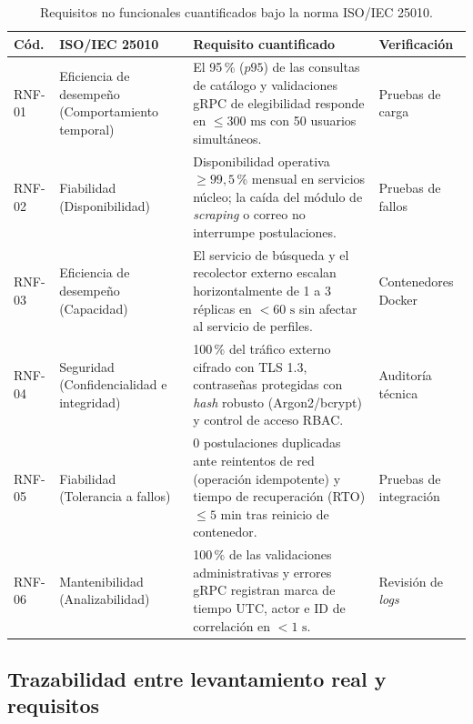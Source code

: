 \documentclass[11pt,a4paper]{article}
\begin{document}
\begin{table}[htbp]
\centering
\caption{Requisitos no funcionales cuantificados bajo la norma ISO/IEC 25010.}
\label{tab:rnf}
\begin{tabularx}{\textwidth}{l >{\raggedright\arraybackslash}p{3.6cm} X l}
\toprule
\textbf{Cód.} & \textbf{ISO/IEC 25010} & \textbf{Requisito cuantificado} & \textbf{Verificación} \\
\midrule
RNF-01 & Eficiencia de desempeño (Comportamiento temporal) & El 95\,\% ($p95$) de las consultas de catálogo y validaciones gRPC de elegibilidad responde en $\le 300\text{ ms}$ con 50 usuarios simultáneos. & Pruebas de carga \\
RNF-02 & Fiabilidad (Disponibilidad) & Disponibilidad operativa $\ge 99{,}5$\,\% mensual en servicios núcleo; la caída del módulo de \textit{scraping} o correo no interrumpe postulaciones. & Pruebas de fallos \\
RNF-03 & Eficiencia de desempeño (Capacidad) & El servicio de búsqueda y el recolector externo escalan horizontalmente de 1 a 3 réplicas en $< 60\text{ s}$ sin afectar al servicio de perfiles. & Contenedores Docker \\
RNF-04 & Seguridad (Confidencialidad e integridad) & 100\,\% del tráfico externo cifrado con TLS 1.3, contraseñas protegidas con \textit{hash} robusto (Argon2/bcrypt) y control de acceso RBAC. & Auditoría técnica \\
RNF-05 & Fiabilidad (Tolerancia a fallos) & 0 postulaciones duplicadas ante reintentos de red (operación idempotente) y tiempo de recuperación (RTO) $\le 5\text{ min}$ tras reinicio de contenedor. & Pruebas de integración \\
RNF-06 & Mantenibilidad (Analizabilidad) & 100\,\% de las validaciones administrativas y errores gRPC registran marca de tiempo UTC, actor e ID de correlación en $< 1\text{ s}$. & Revisión de \textit{logs} \\
\bottomrule
\end{tabularx}
\end{table}

\subsection{Trazabilidad entre levantamiento real y requisitos}
\end{document}
